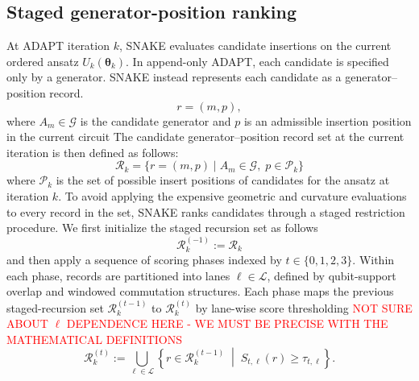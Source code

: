 \documentclass[
  reprint,
  amsmath,
  amssymb,
  aps,
  pra,
  nofootinbib,
  superscriptaddress,
  floatfix
]{revtex4-2}
\newcommand{\Gset}{\mathcal{G}}
\newcommand{\Pcal}{\mathcal{P}}
\begin{document}
\subsection{Staged generator-position ranking}
%
At ADAPT iteration \(k\), \textsc{SNAKE} evaluates candidate insertions on the current ordered ansatz \(U_k(\boldsymbol\theta_k)\). In append-only ADAPT, each candidate is specified only by a generator. \textsc{SNAKE} instead represents each candidate as a generator--position record.
\[
r = (m,p),
\]
%
where \(A_m\in\mathcal{G}\) is the candidate generator and \(p\) is an admissible insertion position in the current circuit 
%
The candidate generator--position record set at the current iteration is then defined as follows: 
\[
\mathcal{R}_k = \{ r=(m,p)\mid A_m\in\mathcal{G},\;p\in\Pcal_k\}
\label{record_set}
\]
%
where \(\Pcal_k\) is the set of possible insert positions of candidates for the ansatz at iteration \(k\). To avoid applying the expensive geometric and curvature evaluations to every record in the set, \textsc{SNAKE} ranks candidates through a staged restriction procedure. We first initialize the staged recursion set as follows
\[
\mathcal R_k^{(-1)} := \mathcal{R}_k
\]
and then apply a sequence of scoring phases indexed by \(t\in\{0,1,2,3\}\). Within each phase, records are partitioned into lanes \(\ell\in\mathcal L\), defined by qubit-support overlap and windowed commutation structures. Each phase maps the previous staged-recursion set \(\mathcal R_k^{(t-1)}\) to \(\mathcal R_k^{(t)}\) by lane-wise score thresholding
\textcolor{red}{NOT SURE ABOUT $\ell$ DEPENDENCE HERE - WE MUST BE PRECISE WITH THE MATHEMATICAL DEFINITIONS}
%
\begin{equation}
\mathcal R_k^{(t)}
:=
\bigcup_{\ell\in\mathcal L}
\left\{
r\in\mathcal R_k^{(t-1)}
\;\middle|\;
S_{t,\ell}(r)\ge\tau_{t,\ell}
\right\}.
\label{eq:phase_restriction_map}
\end{equation}
\end{document}
